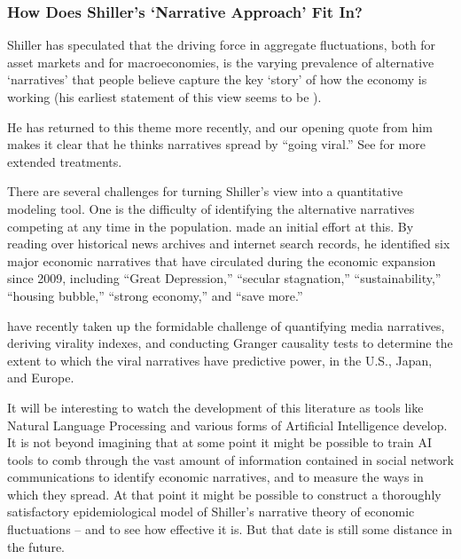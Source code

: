 
\subsubsection{How Does Shiller's `Narrative Approach' Fit In?}\label{narrativeApproach}

Shiller has speculated that the driving force in aggregate fluctuations, both for asset markets and for macroeconomies, is the varying prevalence of alternative `narratives' that people believe capture the key `story' of how the economy is working (his earliest statement of this view seems to be \href{https://www.jstor.org/stable/2117915}{\cite{shiller1995conversation}}).

He has returned to this theme more recently, and our opening quote from him makes it clear that he thinks narratives spread by ``going viral.''  See \citep{shiller2017narrative,shiller_narrative_2019} for more extended treatments.

There are several challenges for turning Shiller's view into a quantitative modeling tool.  One is the difficulty of identifying the alternative narratives competing at any time in the population.
\href{https://github.com/iworld1991/EpiExp/blob/master/Literature/shiller2020popular.pdf}{\cite{shiller2020popular}} made an initial effort at this.  By reading over historical news archives and internet search records, he identified six major economic narratives that have circulated during the economic expansion since 2009, including ``Great Depression,'' ``secular stagnation,'' ``sustainability,'' ``housing bubble,'' ``strong economy,'' and ``save more.''

\cite{larsen2019business} have recently taken up the formidable challenge of quantifying media narratives, deriving virality indexes, and conducting Granger causality tests to determine the extent to which the viral narratives have predictive power, in the U.S., Japan, and Europe.

It will be interesting to watch the development of this literature as tools like Natural Language Processing and various forms of Artificial Intelligence develop.
It is not beyond imagining that at some point it might be possible to train AI tools to comb through the vast amount of information contained in social network communications to identify economic narratives, and to measure the ways in which they spread.  At that point it might be possible to construct a thoroughly satisfactory epidemiological model of Shiller's narrative theory of economic fluctuations -- and to see how effective it is.  But that date is still some distance in the future.



